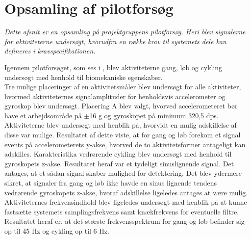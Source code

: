 \section{Opsamling af pilotforsøg}
\textit{Dette afsnit er en opsamling på projektgruppens pilotforsøg. Heri blev signalerne for aktiviteterne undersøgt, hvorudfra en række krav til systemets dele kan defineres i kravspecifikationen.}

Igennem pilotforsøget, som ses i , blev aktiviteterne gang, løb og cykling undersøgt med henhold til biomekaniske egenskaber. \\
Tre mulige placeringer af en aktivitetsmåler blev undersøgt for alle aktiviteter, hvormed aktiviteternes signalamplituder for henholdsvis accelerometer og gyroskop blev undersøgt. Placering A blev valgt, hvorved accelerometeret bør have et arbejdsområde på $\pm$16 g og gyroskopet på minimum 320,5 dps. \\
Aktiviteterne blev undersøgt med henblik på, hvorvidt en mulig adskillelse af disse var mulige. Resultatet af dette viste, at for gang og løb forekom et signal events på accelerometerets y-akse, hvorved de to aktivitetsformer antageligt kan adskilles. Karakteristika vedrørende cykling blev undersøgt med henhold til gyroskopets z-akse. Resultatet heraf var et tydeligt sinuslignende signal. Det antages, at et sådan signal skaber mulighed for detektering. Det blev ydermere sikret, at signaler fra gang og løb ikke havde en sinus lignende tendens vedrørende gyroskopets z-akse, hvoraf adskillelse ligeledes antages at være mulig. \\
Aktiviteternes frekvensindhold blev ligeledes undersøgt med henblik på at kunne fastsætte systemets samplingsfrekvens samt knækfrekvens for eventuelle filtre. Resultatet heraf er, at det største frekvensspektrum for gang og løb befinder sig op til 45 Hz og cykling op til 6 Hz. 

